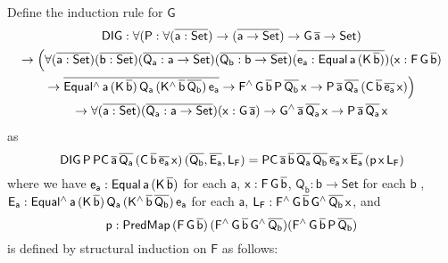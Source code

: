 \documentclass[acmsmall,screen,review,anonymous]{acmart}
\theoremstyle{definition}
\begin{document}
Define the induction rule for $\mathsf{G}$
\begin{multline}
\mathsf{DIG : \forall (P : \forall (\overline{a : Set}) \to (\overline{a \to Set}) \to G\,\overline{a} \to Set)} \\
\mathsf{\to \Big(
\forall (\overline{a : Set}) (\overline{b : Set}) (\overline{Q_a : a \to Set}) (\overline{Q_b : b \to Set}) (\overline{e_a : Equal\,a\,(K\,\overline{b})}) (x : F\,G\,\overline{b})} \\
\mathsf{\to \overline{Equal^{\wedge}\,a\,(K\,\overline{b})\,Q_a\,(K^{\wedge}\,\overline{b}\,\overline{Q_b})\,e_a}
	\to F^{\wedge}\,G\,\overline{b}\,P\,\overline{Q_b}\,x
	\to P\,\overline{a}\,\overline{Q_a}\,(C\,\overline{b}\,\overline{e_a}\,x)
\Big)} \\
\mathsf{\to \forall (\overline{a : Set})(\overline{Q_a : a \to Set})(x : G\,\overline{a}) \to G^{\wedge}\,\overline{a}\,\overline{Q_a}\,x \to P\,\overline{a}\,\overline{Q_a}\,x}
\end{multline}
as
\[
\mathsf{DIG\,P\,PC\,\overline{a}\,\overline{Q_a}\,(C\,\overline{b}\,\overline{e_a}\,x)\,(\overline{Q_b}, \overline{E_a}, L_F)
= PC\,\overline{a}\,\overline{b}\,\overline{Q_a}\,\overline{Q_b}\,\overline{e_a}\,x\,\overline{E_a}\,(p\,x\,L_F)}
\]
where
we have $\mathsf{e_a : Equal\,a\,(K\,\overline{b})}$ for each $\mathsf{a}$,
$\mathsf{x : F\,G\,\overline{b}}$,
$\mathsf{Q_b : b \to Set}$ for each $\mathsf{b}$ ,
$\mathsf{E_a : Equal^{\wedge}\,a\,(K\,\overline{b})\,Q_a\,(K^{\wedge}\,\overline{b}\,\overline{Q_b})\,e_a}$  for each $\mathsf{a}$,
$\mathsf{L_F : F^{\wedge}\,G\,\overline{b}\,G^{\wedge}\,{\overline{Q_b}}\,x}$,
and
\[
\mathsf{p : PredMap\,(F\,G\,\overline{b})\,(F^{\wedge}\,G\,\overline{b}\,G^{\wedge}\,\overline{Q_b}) (F^{\wedge}\,G\,\overline{b}\,P\,\overline{Q_b})}
\]
is defined by structural induction on $\mathsf{F}$ as follows:
\end{document}
